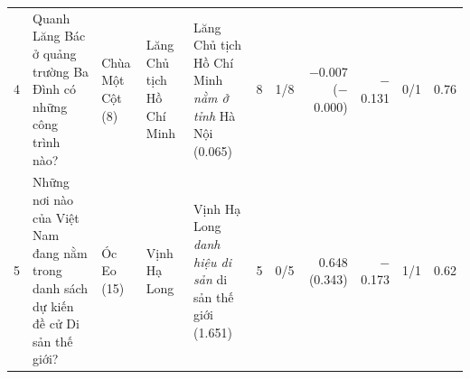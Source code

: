 \begin{table}[!t]
\begin{tabularx}{\linewidth}{@{}rL{3.6cm}L{2.2cm}L{2.0cm}Yrrrrrr@{}}
4 & Quanh Lăng Bác ở quảng trường Ba Đình có những công trình nào? & Chùa Một Cột (8) & Lăng Chủ tịch Hồ Chí Minh & Lăng Chủ tịch Hồ Chí Minh \textit{nằm ở tỉnh} Hà Nội (0.065) & 8 & 1/8 & $-$0.007 ($-$0.000) & $-$0.131 & 0/1 & 0.76\\
5 & Những nơi nào của Việt Nam đang nằm trong danh sách dự kiến đề cử Di sản thế giới? & Óc Eo (15) & Vịnh Hạ Long & Vịnh Hạ Long \textit{danh hiệu di sản} di sản thế giới (1.651) & 5 & 0/5 & 0.648 (0.343) & $-$0.173 & 1/1 & 0.62\\
\bottomrule
\end{tabularx}
\par{}
\end{table}
